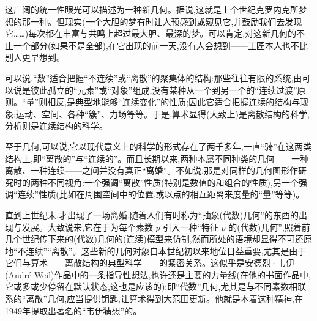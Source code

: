 这广阔的统一性眼光可以描述为一种新几何。据说,这就是上个世纪克罗内克所梦想的那一种。但现实(一个大胆的梦有时让人预感到或窥见它,并鼓励我们去发现它……)每次都在丰富与共鸣上超过最大胆、最深的梦。可以肯定,对这新几何的不止一个部分(如果不是全部),在它出现的前一天,没有人会想到——工匠本人也不比别人更早想到。

可以说,“数”适合把握“不连续”或“离散”的聚集体的结构:那些往往有限的系统,由可以说是彼此孤立的“元素”或“对象”组成,没有某种从一个到另一个的“连续过渡”原则。“量”则相反,是典型地能够“连续变化”的性质;因此它适合把握连续的结构与现象:运动、空间、各种“簇”、力场等等。于是,算术显得(大致上)是离散结构的科学,分析则是连续结构的科学。

至于几何,可以说,它以现代意义上的科学的形式存在了两千多年,一直“骑”在这两类结构上,即“离散的”与“连续的”。而且长期以来,两种本属不同种类的几何——一种离散、一种连续——之间并没有真正“离婚”。不如说,那是对同样的几何图形作研究时的两种不同视角:一个强调“离散”性质(特别是数值的和组合的性质),另一个强调“连续”性质(比如在周围空间中的位置,或以点的相互距离来度量的“量”等等)。

直到上世纪末,才出现了一场离婚,随着人们有时称为“抽象(代数)几何”的东西的出现与发展。大致说来,它在于为每个素数 $p$ 引入一种“特征 $p$ 的(代数)几何”,照着前几个世纪传下来的(代数)几何的(连续)模型来仿制,然而所处的语境却显得不可还原地“不连续”“离散”。这些新的几何对象自本世纪初以来地位日益重要,尤其是由于它们与算术——离散结构的典型科学——的紧密关系。这似乎是安德烈·韦伊(André Weil)作品中的一条指导性想法,也许还是主要的力量线(在他的书面作品中,它或多或少停留在默认状态,这也是应该的):即“代数”几何,尤其是与不同素数相联系的“离散”几何,应当提供钥匙,让算术得到大范围更新。他就是本着这种精神,在1949年提取出著名的“韦伊猜想”的。


